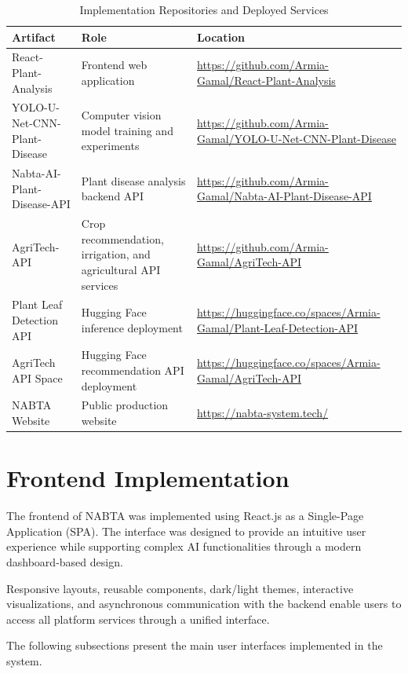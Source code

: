 \begin{table}[H]
\centering
\caption{Implementation Repositories and Deployed Services}
\label{tab:implementation_artifacts}
\renewcommand{\arraystretch}{1.25}
\small
\begin{tabularx}{\textwidth}{L{3.4cm} L{3.2cm} Y}
\toprule
\textbf{Artifact} & \textbf{Role} & \textbf{Location} \\
\midrule
React-Plant-Analysis & Frontend web application & \url{https://github.com/Armia-Gamal/React-Plant-Analysis} \\
YOLO-U-Net-CNN-Plant-Disease & Computer vision model training and experiments & \url{https://github.com/Armia-Gamal/YOLO-U-Net-CNN-Plant-Disease} \\
Nabta-AI-Plant-Disease-API & Plant disease analysis backend API & \url{https://github.com/Armia-Gamal/Nabta-AI-Plant-Disease-API} \\
AgriTech-API & Crop recommendation, irrigation, and agricultural API services & \url{https://github.com/Armia-Gamal/AgriTech-API} \\
Plant Leaf Detection API & Hugging Face inference deployment & \url{https://huggingface.co/spaces/Armia-Gamal/Plant-Leaf-Detection-API} \\
AgriTech API Space & Hugging Face recommendation API deployment & \url{https://huggingface.co/spaces/Armia-Gamal/AgriTech-API} \\
NABTA Website & Public production website & \url{https://nabta-system.tech/} \\
\bottomrule
\end{tabularx}
\end{table}

\section{Frontend Implementation}
\label{sec:frontend}

The frontend of NABTA was implemented using React.js as a Single-Page Application (SPA). The interface was designed to provide an intuitive user experience while supporting complex AI functionalities through a modern dashboard-based design.

Responsive layouts, reusable components, dark/light themes, interactive visualizations, and asynchronous communication with the backend enable users to access all platform services through a unified interface.

The following subsections present the main user interfaces implemented in the system.

